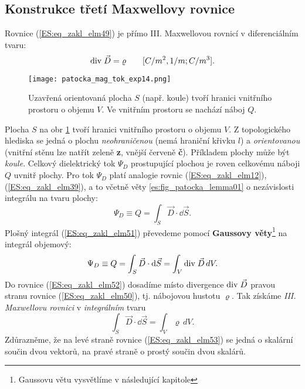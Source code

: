     \subsection{Konstrukce třetí Maxwellovy rovnice}\label{ES:ssec02}
      Rovnice (\ref{ES:eq_zakl_elm49}) je přímo III. Maxwellovou rovnicí v diferenciálním tvaru:
      \begin{equation}\label{ES:eq_zakl_elm50}
        \mathrm{div}\;\vec{D} = \varrho \qquad [C/m^2, 1/m; C/m^3]. 
      \end{equation} 
      \begin{figure}[ht!]
        \centering
        \texttt{[image: patocka\_mag\_tok\_exp14.png]}
        \caption{Uzavřená orientovaná plocha \(S\) (např. koule) tvoří hranici vnitřního prostoru o 
                 objemu \(V\). Ve vnitřním prostoru se nachází náboj \(Q\).}
        \label{es:fig_patocka_mag_tok_exp14}
      \end{figure}
      
      Plocha \(S\) na obr \ref{es:fig_patocka_mag_tok_exp14} tvoří hranici vnitřního prostoru o 
      objemu \(V\). Z topologického hlediska se jedná o plochu \emph{neohraničenou} (nemá hraniční 
      křivku \(l\)) a \emph{orientovanou} (vnitřní stěnu lze natřít zeleně \textbf{z}, vnější 
      červeně \textbf{č}). Příkladem plochy může být \emph{koule}. Celkový dielektrický tok 
      \(\Psi_D\) prostupující plochou je roven celkovému náboji \(Q\) uvnitř plochy. Pro tok 
      \(\Psi_D\) platí analogie rovnic (\ref{ES:eq_zakl_elm12}), (\ref{ES:eq_zakl_elm39}), a to 
      včetně věty \ref{es:fig_patocka_lemma01} o nezávislosti integrálu na tvaru plochy:
      \begin{equation}\label{ES:eq_zakl_elm51}
        \Psi_D \equiv Q = \int_S\vec{D}\cdot \dd{\vec{S}}.
      \end{equation} 
      Plošný integrál (\ref{ES:eq_zakl_elm51}) převedeme pomocí \textbf{Gaussovy 
      věty}\footnote{Gaussovu větu vysvětlíme v následující kapitole} na integrál objemový:
      \begin{equation}\label{ES:eq_zakl_elm52}
        \Psi_D \equiv Q = \int_S\vec{D}\cdot \mathop{}\!\mathrm{d}\vec{S} = \int_V\mathrm{div}\;\vec{D}\,dV.
      \end{equation} 
      Do rovnice (\ref{ES:eq_zakl_elm52}) dosadíme místo divergence \(\mathrm{div}\;\vec{D}\) pravou stranu 
      rovnice (\ref{ES:eq_zakl_elm50}), tj. nábojovou hustotu \(\varrho\). Tak získáme \emph{III. 
      Maxwellovu rovnici} v \emph{integrálním} tvaru
      \begin{equation}\label{ES:eq_zakl_elm53}
        \boxed{\int_S\vec{D}\cdot \dd{\vec{S}} = \int_V\varrho\,dV}.
      \end{equation} 
      Zdůrazněme, že na levé straně rovnice (\ref{ES:eq_zakl_elm53}) se jedná o skalární součin 
      dvou vektorů, na pravé straně o prostý součin dvou skalárů.
      
